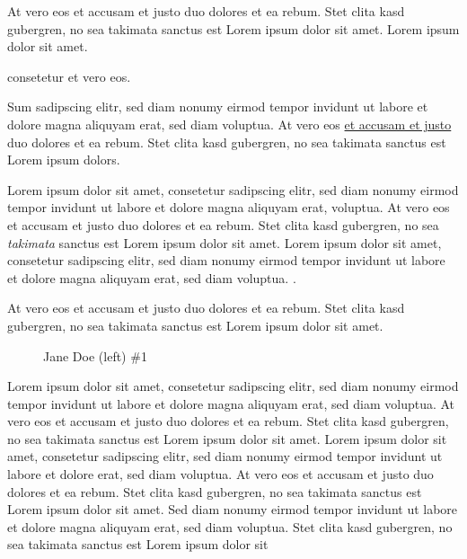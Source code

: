 \documentclass[12pt]{report}
\begin{document}
At vero eos et accusam et justo duo dolores et ea rebum. Stet clita kasd gubergren, no sea takimata sanctus est Lorem ipsum dolor sit amet. Lorem ipsum dolor sit amet.

consetetur et vero eos.

Sum sadipscing elitr, sed diam nonumy eirmod tempor invidunt ut labore et dolore magna aliquyam erat, sed diam voluptua. At vero eos \underline{et accusam et justo} duo dolores et ea rebum. Stet clita kasd gubergren, no sea takimata sanctus est Lorem ipsum dolors.

Lorem ipsum dolor sit amet, consetetur sadipscing elitr, sed diam nonumy eirmod tempor invidunt ut labore et dolore magna aliquyam erat,  voluptua. At vero eos et accusam et justo duo dolores et ea rebum. Stet clita kasd gubergren, no sea \textit{takimata} sanctus est Lorem ipsum dolor sit amet. Lorem ipsum dolor sit amet, consetetur sadipscing elitr, sed diam nonumy eirmod tempor invidunt ut labore et dolore magna aliquyam erat, sed diam voluptua. .


At vero eos et accusam et justo duo dolores et ea rebum. Stet clita kasd gubergren, no sea takimata sanctus est Lorem ipsum dolor sit amet.

\begin{figure}
  \centering
  \caption*{Jane Doe (left) \#1}
\end{figure}

Lorem ipsum dolor sit amet, consetetur sadipscing elitr, sed diam nonumy eirmod tempor invidunt ut labore et dolore magna aliquyam erat, sed diam voluptua. At vero eos et accusam et justo duo dolores et ea rebum. Stet clita kasd gubergren, no sea takimata sanctus est Lorem ipsum dolor sit amet. Lorem ipsum dolor sit amet, consetetur sadipscing elitr, sed diam nonumy eirmod tempor invidunt ut labore et dolore  erat, sed diam voluptua. At vero eos et accusam et justo duo dolores et ea rebum. Stet clita kasd gubergren, no sea takimata sanctus est Lorem ipsum dolor sit amet. Sed diam nonumy eirmod tempor invidunt ut labore et dolore magna aliquyam erat, sed diam voluptua. Stet clita kasd gubergren, no sea takimata sanctus est Lorem ipsum dolor sit 
\end{document}
